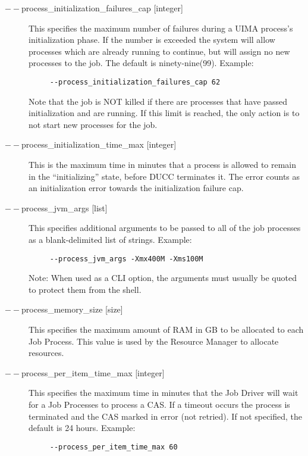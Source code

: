\begin{description}
           \item[$--$process\_initialization\_failures\_cap {[integer]} ] This specifies the maximum
             number of failures during a UIMA process's initialization phase.  If the number is
             exceeded the system will allow processes which are already running to continue, but
             will assign no new processes to the job.  The default is ninety-nine(99). Example:
             \begin{verbatim}
     --process_initialization_failures_cap 62
             \end{verbatim}
             Note that the job is NOT killed if there are processes that have passed initialization and are 
             running. If this limit is reached, the only action is to not start new processes for the job. 

           \item[$--$process\_initialization\_time\_max {[integer]}] This is the maximum time in minutes that 
             a process is allowed to remain in the ``initializing'' state, before DUCC terminates it.  The 
             error counts as an initialization error towards the initialization failure cap.

           \item[$--$process\_jvm\_args {[list]} ] This specifies additional arguments to be passed to
             all of the job processes as a blank-delimited list of strings. Example:
             \begin{verbatim}
     --process_jvm_args -Xmx400M -Xms100M
             \end{verbatim}
             Note: When used as a CLI option, the arguments must usually be
             quoted to protect them from the shell.
                          
           \item[$--$process\_memory\_size {[size]} ] This specifies the maximum amount of RAM in GB
             to be allocated to each Job Process.  This value is used by the Resource Manager to
             allocate resources.

           \item[$--$process\_per\_item\_time\_max {[integer]} ] This specifies the maximum time in
             minutes that the Job Driver will wait for a Job Processes to process a CAS. If a
             timeout occurs the process is terminated and the CAS marked in error (not retried). If
             not specified, the default is 24 hours. Example:
             \begin{verbatim}
     --process_per_item_time_max 60
             \end{verbatim}
             

\end{description}
